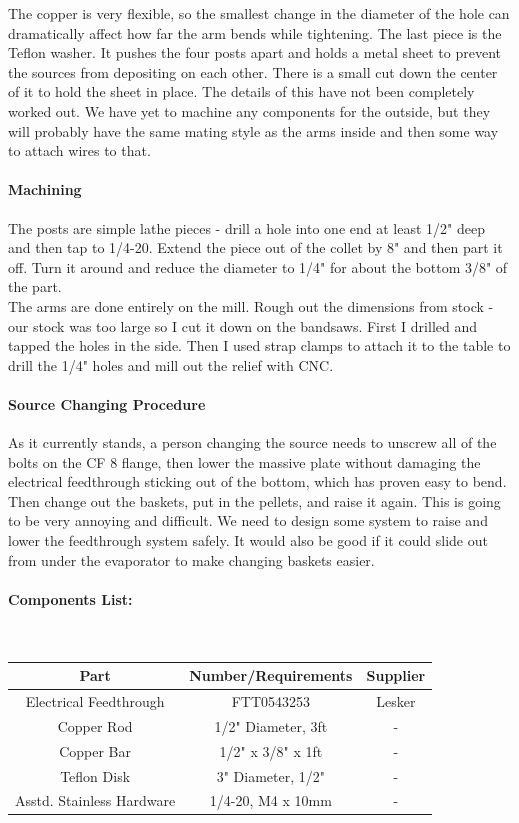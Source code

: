 \documentclass[12pt]{report}
\begin{document}
The copper is very flexible, so the smallest change in the diameter of the hole can dramatically affect how far the arm bends while tightening. The last piece is the Teflon washer. It pushes the four posts apart and holds a metal sheet to prevent the sources from depositing on each other. There is a small cut down the center of it to hold the sheet in place. The details of this have not been completely worked out. We have yet to machine any components for the outside, but they will probably have the same mating style as the arms inside and then some way to attach wires to that. 
\paragraph{Machining}
The posts are simple lathe pieces - drill a hole into one end at least 1/2" deep and then tap to 1/4-20. Extend the piece out of the collet by 8" and then part it off. Turn it around and reduce the diameter to 1/4" for about the bottom 3/8" of the part.\\
The arms are done entirely on the mill. Rough out the dimensions from stock - our stock was too large so I cut it down on the bandsaws. First I drilled and tapped the holes in the side. Then I used strap clamps to attach it to the table to drill the 1/4" holes and mill out the relief with CNC.

\paragraph{Source Changing Procedure}
As it currently stands, a person changing the source needs to unscrew all of the bolts on the CF 8 flange, then lower the massive plate without damaging the electrical feedthrough sticking out of the bottom, which has proven easy to bend. Then change out the baskets, put in the pellets, and raise it again. This is going to be very annoying and difficult. We need to design some system to raise and lower the feedthrough system safely. It would also be good if it could slide out from under the evaporator to make changing baskets easier.

\paragraph{Components List:} \hspace{1cm} \\
\begin{tabular}{c|c|c}
Part & Number/Requirements & Supplier\\
\hline
Electrical Feedthrough & FTT0543253 & Lesker \\
Copper Rod & 1/2" Diameter, 3ft & -\\
Copper Bar & 1/2" x 3/8" x 1ft & -\\
Teflon Disk & 3" Diameter, 1/2" & -\\ 
Asstd. Stainless Hardware & 1/4-20, M4 x 10mm& - 

\end{tabular}
\end{document}
